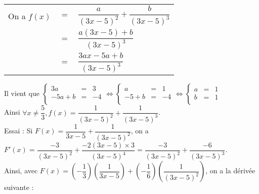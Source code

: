 \begin{tabular}{lll}
\hspace*{-.3cm} On a $f(x)$ & $ = $ & $\dfrac{a}{\left(3x - 5\right)^2} + \dfrac{b}{\left(3x-5\right)^3}$ \vspace*{.3cm} \\
& $=$ & $\dfrac{a\left(3x-5\right) + b}{\left(3x-5\right)^3}$ \vspace*{.3cm} \\
& $=$ & $\dfrac{3ax - 5a + b}{\left(3x-5\right)^3}$ \\
\end{tabular}

\vspace*{.3cm}

Il vient que $\left\{
  \begin{array}{rll}
    3a & = & 3 \\
    -5a + b & = & -4 \\
  \end{array}
\right. \Longleftrightarrow \left\{
  \begin{array}{rll}
    a & = & 1 \\
    -5 + b & = & -4 \\
  \end{array}
\right. \Longleftrightarrow \left\{
  \begin{array}{rll}
    a & = & 1 \\
    b & = & 1 \\
  \end{array}
\right.$ \vspace*{.3cm} \\

Ainsi $\forall x \neq \dfrac{5}{3}, f(x) = \dfrac{1}{\left(3x-5\right)^2} + \dfrac{1}{\left(3x-5\right)^3}$. \vspace*{.3cm} \\

Essai : Si $F(x) = \dfrac{1}{3x-5} + \dfrac{1}{\left(3x-5\right)^2}$, on a $F'(x) = \dfrac{-3}{\left(3x-5\right)^2} + \dfrac{-2\left(3x-5\right)\times 3}{\left(3x-5\right)^4} = \dfrac{-3}{\left(3x-5\right)^2} + \dfrac{-6}{\left(3x-5\right)^3}$. \vspace*{.3cm} \\

Ainsi, avec $F(x) = \left(-\dfrac{1}{3}\right)\left(\dfrac{1}{3x-5}\right) + \left(-\dfrac{1}{6}\right)\left(\dfrac{1}{\left(3x-5\right)^2}\right)$, on a la dérivée suivante : \vspace*{.3cm} \\

